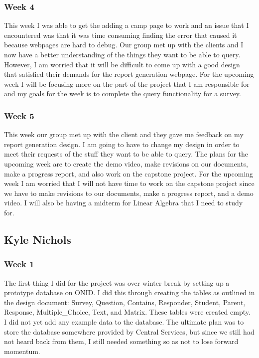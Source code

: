 \documentclass[letterpaper,10pt,serif, draftclsnofoot,onecolumn, compsoc, titlepage]{IEEEtran}
\begin{document}
\subsubsection{Week 4}
This week I was able to get the adding a camp page to work and an issue that I encountered was that it was time consuming finding the error that caused it because webpages are hard to debug.
Our group met up with the clients and I now have a better understanding of the things they want to be able to query.
However, I am worried that it will be difficult to come up with a good design that satisfied their demands for the report generation webpage.
For the upcoming week I will be focusing more on the part of the project that I am responsible for and my goals for the week is to complete the query functionality for a survey.
\subsubsection{Week 5}
This week our group met up with the client and they gave me feedback on my report generation design.
I am going to have to change my design in order to meet their requests of the stuff they want to be able to query.
The plans for the upcoming week are to create the demo video, make revisions on our documents, make a progress report, and also work on the capstone project.
For the upcoming week I am worried that I will not have time to work on the capstone project since we have to make revisions to our documents, make a progress report, and a demo video.
I will also be having a midterm for Linear Algebra that I need to study for.

\subsection{Kyle Nichols}
\subsubsection{Week 1}
The first thing I did for the project was over winter break by setting up a prototype database on ONID.
I did this through creating the tables as outlined in the design document: Survey, Question, Contains, Responder, Student, Parent, Response, Multiple\_Choice, Text, and Matrix.
These tables were created empty.
I did not yet add any example data to the database.
The ultimate plan was to store the database somewhere provided by Central Services, but since we still had not heard back from them, I still needed something so as not to lose forward momentum.
\end{document}
